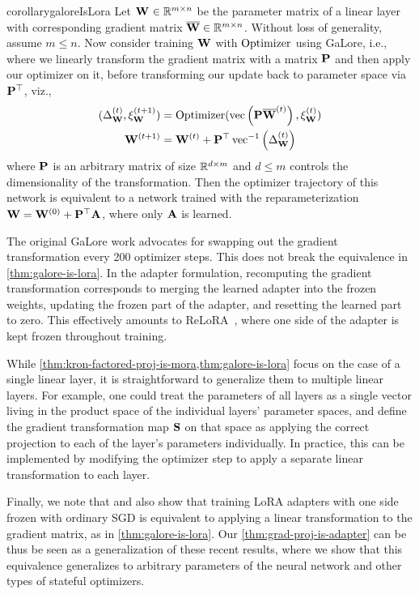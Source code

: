 \begin{restatable}{corollary}{galoreIsLora}
Let ${\mathbf{W}}^{} \in \mathbb{R}^{m \times n}$ be the parameter matrix of a linear layer with corresponding gradient matrix $\overline{{\mathbf{W}}} \in \mathbb{R}^{m \times n}$.
Without loss of generality, assume $m \le n$. 
Now consider training ${\mathbf{W}}$ with $\operatorname{Optimizer}$ using GaLore, i.e., where we linearly transform the gradient matrix with a matrix ${\mathbf{P}}$
and then apply our optimizer on it, before transforming our update back to parameter space via ${\mathbf{P}}^\top$, viz.,
\begin{align*}
   (\Delta_{{\mathbf{W}}}^{(t)}, \xi_{{\mathbf{W}}}^{(t+1)}) &= \operatorname{Optimizer}(\operatorname{vec}\left({\mathbf{P}} {\overline{{\mathbf{W}}}}^{(t)}\right), \xi_{{\mathbf{W}}}^{(t)}) \\
   {\mathbf{W}}^{(t+1)} &= {\mathbf{W}}^{(t)} + {\mathbf{P}}^{\top}\operatorname{vec}^{-1}\left(\Delta_{{\mathbf{W}}}^{(t)}\right)
\end{align*}
where ${\mathbf{P}}$ is an arbitrary matrix of size $\mathbb{R}^{d \times m}$ and $d \le m$ controls the dimensionality of the transformation.
Then the optimizer trajectory of this network is equivalent to a network trained with the reparameterization ${\mathbf{W}} = {\mathbf{W}}^{(0)} + {\mathbf{P}}^\top {\mathbf{A}}$,
where only ${\mathbf{A}}$ is learned.
\label{thm:galore-is-lora}
\end{restatable}
\vcram{-1mm}
\begin{remark}
The original GaLore work advocates for swapping out the gradient transformation every 200 optimizer steps. 
This does not break the equivalence in \cref{thm:galore-is-lora}.
In the adapter formulation, recomputing the gradient transformation corresponds to merging the learned adapter into the frozen weights, updating the frozen part of the adapter, and resetting the learned part to zero.
This effectively amounts to ReLoRA~\citep{relora}, where one side of the adapter is kept frozen throughout training.
\end{remark}


While \cref{thm:kron-factored-proj-is-mora,thm:galore-is-lora} focus on the case of a single linear layer, it is straightforward to generalize them to multiple linear layers.
For example, one could treat the parameters of all layers as a single vector living in the product space of the individual layers' parameter spaces, and define the gradient transformation map ${\mathbf{S}}$ on that space as applying the correct projection to each of the layer's parameters individually.
In practice, this can be implemented by modifying the optimizer step to apply a separate linear transformation to each layer.


Finally, we note that
 \citet{hao2024flora} and \citet{loeschckeloqt} also show that  training LoRA adapters with one side frozen with ordinary SGD is equivalent to applying a linear transformation to the gradient matrix, as in \cref{thm:galore-is-lora}.  Our \cref{thm:grad-proj-is-adapter} can be thus be seen as a generalization of these recent results, where we show that this equivalence generalizes to arbitrary parameters of the neural network and  other types of stateful optimizers.





